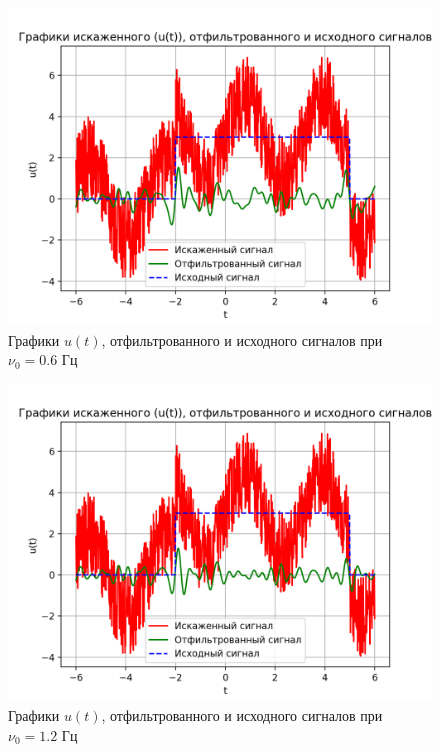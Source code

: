 \clearpage

\begin{figure}[ht!]
    \centering
    \includegraphics[scale=0.75]{media/1 task/low_freq/Cleaned_4_2_2_-0,5975975975975976.png}
    \caption{Графики  $u(t)$, отфильтрованного и исходного сигналов при $\nu_0=0.6$ Гц}
    \label{fig:cleaned_4_2_2_0.6}
\end{figure}

\begin{figure}[ht!]
    \centering
    \includegraphics[scale=0.75]{media/1 task/low_freq/Cleaned_4_2_2_-1,1981981981981982.png}
    \caption{Графики  $u(t)$, отфильтрованного и исходного сигналов при $\nu_0=1.2$ Гц}
    \label{fig:cleaned_4_2_2_1.2}
\end{figure}

